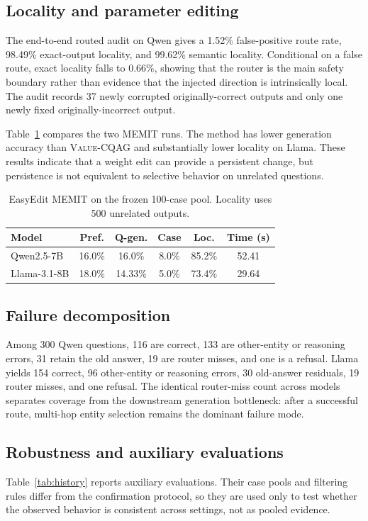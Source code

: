 \documentclass{article}
\newcommand{\method}{\textsc{Value-CQAG}}
\newcommand{\memit}{\textsc{MEMIT}}
\begin{document}
\subsection{Locality and parameter editing}
The end-to-end routed audit on Qwen gives a 1.52\% false-positive route rate, 98.49\% exact-output locality, and 99.62\% semantic locality. Conditional on a false route, exact locality falls to 0.66\%, showing that the router is the main safety boundary rather than evidence that the injected direction is intrinsically local. The audit records 37 newly corrupted originally-correct outputs and only one newly fixed originally-incorrect output.

Table~\ref{tab:edit} compares the two \memit{} runs. The method has lower generation accuracy than \method{} and substantially lower locality on Llama. These results indicate that a weight edit can provide a persistent change, but persistence is not equivalent to selective behavior on unrelated questions.

\begin{table}[t]
\centering
\caption{EasyEdit \memit{} on the frozen 100-case pool. Locality uses 500 unrelated outputs.}
\label{tab:edit}
\small
\setlength{\tabcolsep}{1.6pt}
\begin{tabular}{lccccc}
\toprule
Model & Pref. & Q-gen. & Case & Loc. & Time (s) \\
\midrule
Qwen2.5-7B & 16.0\% & 16.0\% & 8.0\% & 85.2\% & 52.41 \\
Llama-3.1-8B & 18.0\% & 14.33\% & 5.0\% & 73.4\% & 29.64 \\
\bottomrule
\end{tabular}
\end{table}

\subsection{Failure decomposition}
Among 300 Qwen questions, 116 are correct, 133 are other-entity or reasoning errors, 31 retain the old answer, 19 are router misses, and one is a refusal. Llama yields 154 correct, 96 other-entity or reasoning errors, 30 old-answer residuals, 19 router misses, and one refusal. The identical router-miss count across models separates coverage from the downstream generation bottleneck: after a successful route, multi-hop entity selection remains the dominant failure mode.

\subsection{Robustness and auxiliary evaluations}
Table~\ref{tab:history} reports auxiliary evaluations. Their case pools and filtering rules differ from the confirmation protocol, so they are used only to test whether the observed behavior is consistent across settings, not as pooled evidence.
\end{document}
